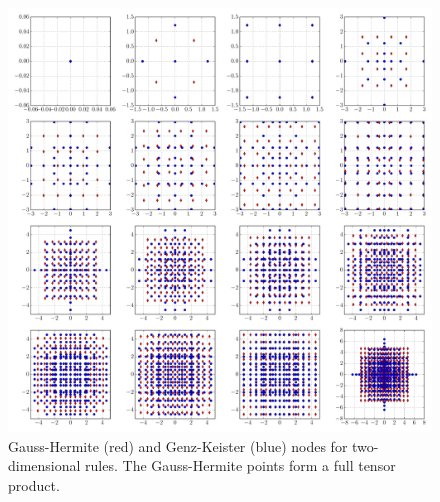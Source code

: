 \documentclass[a4paper,10pt]{article}
\begin{document}
\begin{figure}[h]
  \centering
  \includegraphics[width=\linewidth]{./img/gk_hermitephy_nodes_2d.pdf}
  \caption{Gauss-Hermite (red) and Genz-Keister (blue) nodes for
  two-dimensional rules. The Gauss-Hermite points form a full tensor
  product.}
  \label{fig:gk_hermitephy_nodes_2d}
\end{figure}

\clearpage
\end{document}
